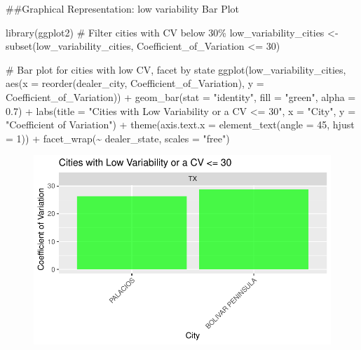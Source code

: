 \documentclass[
  letterpaper,
  DIV=11,
  numbers=noendperiod]{scrartcl}
\newenvironment{Shaded}{\begin{snugshade}}{\end{snugshade}}
\newcommand{\AttributeTok}[1]{\textcolor[rgb]{0.40,0.45,0.13}{#1}}
\newcommand{\CommentTok}[1]{\textcolor[rgb]{0.37,0.37,0.37}{#1}}
\newcommand{\DecValTok}[1]{\textcolor[rgb]{0.68,0.00,0.00}{#1}}
\newcommand{\FloatTok}[1]{\textcolor[rgb]{0.68,0.00,0.00}{#1}}
\newcommand{\FunctionTok}[1]{\textcolor[rgb]{0.28,0.35,0.67}{#1}}
\newcommand{\NormalTok}[1]{\textcolor[rgb]{0.00,0.23,0.31}{#1}}
\newcommand{\OtherTok}[1]{\textcolor[rgb]{0.00,0.23,0.31}{#1}}
\newcommand{\SpecialCharTok}[1]{\textcolor[rgb]{0.37,0.37,0.37}{#1}}
\newcommand{\StringTok}[1]{\textcolor[rgb]{0.13,0.47,0.30}{#1}}
\begin{document}
\#\#Graphical Representation: low variability Bar Plot

\begin{Shaded}
\begin{Highlighting}[]
\FunctionTok{library}\NormalTok{(ggplot2)}
\CommentTok{\# Filter cities with CV below 30\%}
\NormalTok{low\_variability\_cities }\OtherTok{\textless{}{-}} \FunctionTok{subset}\NormalTok{(low\_variability\_cities, Coefficient\_of\_Variation }\SpecialCharTok{\textless{}=} \DecValTok{30}\NormalTok{) }

\CommentTok{\# Bar plot for cities with low CV, facet by state}
\FunctionTok{ggplot}\NormalTok{(low\_variability\_cities, }\FunctionTok{aes}\NormalTok{(}\AttributeTok{x =} \FunctionTok{reorder}\NormalTok{(dealer\_city, Coefficient\_of\_Variation), }\AttributeTok{y =}\NormalTok{ Coefficient\_of\_Variation)) }\SpecialCharTok{+}
  \FunctionTok{geom\_bar}\NormalTok{(}\AttributeTok{stat =} \StringTok{"identity"}\NormalTok{, }\AttributeTok{fill =} \StringTok{"green"}\NormalTok{, }\AttributeTok{alpha =} \FloatTok{0.7}\NormalTok{) }\SpecialCharTok{+}
  \FunctionTok{labs}\NormalTok{(}\AttributeTok{title =} \StringTok{"Cities with Low Variability or a CV \textless{}= 30"}\NormalTok{, }\AttributeTok{x =} \StringTok{"City"}\NormalTok{, }\AttributeTok{y =} \StringTok{"Coefficient of Variation"}\NormalTok{) }\SpecialCharTok{+}
  \FunctionTok{theme}\NormalTok{(}\AttributeTok{axis.text.x =} \FunctionTok{element\_text}\NormalTok{(}\AttributeTok{angle =} \DecValTok{45}\NormalTok{, }\AttributeTok{hjust =} \DecValTok{1}\NormalTok{)) }\SpecialCharTok{+}
  \FunctionTok{facet\_wrap}\NormalTok{(}\SpecialCharTok{\textasciitilde{}}\NormalTok{ dealer\_state, }\AttributeTok{scales =} \StringTok{"free"}\NormalTok{)}
\end{Highlighting}
\end{Shaded}

\begin{figure}[H]

{\centering \includegraphics{CV_Communities2_files/figure-pdf/unnamed-chunk-21-1.pdf}

}

\end{figure}
\end{document}
